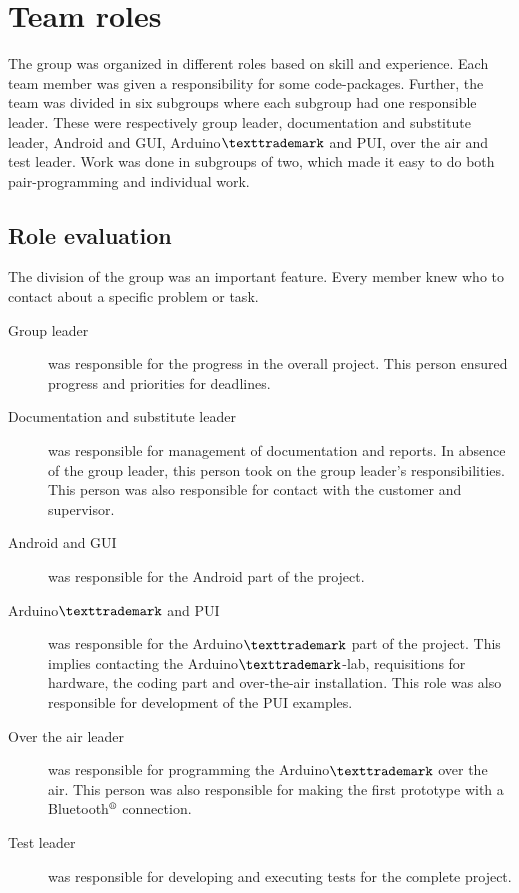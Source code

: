 \section{Team roles}
The group was organized in different roles based on skill and experience. Each team member was given a responsibility for some code-packages. Further, the team was divided in six subgroups where each subgroup had one responsible leader. These were respectively group leader, documentation and substitute leader, Android and GUI, Arduino$\texttrademark$ and PUI, over the air and test leader. Work was done in subgroups of two, which made it easy to do both pair-programming and individual work.

\subsection{Role evaluation}
The division of the group was an important feature. Every member knew who to contact about a specific problem or task.\\

\begin{description}
	\item[Group leader]{was responsible for the progress in the overall project. This person ensured progress and priorities for deadlines.}
	\item[Documentation and substitute leader]{was responsible for management of documentation and reports. In absence of the group leader, this person took on the group leader's responsibilities. This person was also responsible for contact with the customer and supervisor.}
	\item[Android and GUI]{was responsible for the Android part of the project.}
	\item[Arduino$\texttrademark$ and PUI]{was responsible for the Arduino$\texttrademark$ part of the project. This implies contacting the Arduino$\texttrademark$-lab, requisitions for hardware, the coding part and over-the-air installation. This role was also responsible for development of the PUI examples.}
	\item[Over the air leader]{was responsible for programming the Arduino$\texttrademark$ over the air. This person was also responsible for making the first prototype with a Bluetooth$\textsuperscript{\textregistered}$  connection.}
	\item[Test leader]{was responsible for developing and executing tests for the complete project.}
\end{description}


